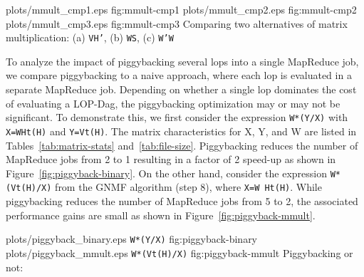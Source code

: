 

\some
{plots/mmult_cmp1.eps}
{fig:mmult-cmp1}
{plots/mmult_cmp2.eps}
{fig:mmult-cmp2}
{plots/mmult_cmp3.eps}
{fig:mmult-cmp3}
{Comparing two alternatives of matrix multiplication: (a) \texttt{V\mmult H'}, (b) \texttt{W\mmult S}, (c) \texttt{W'\mmult W}}


 To analyze the impact of piggybacking several lops into a single
MapReduce job, we compare piggybacking to a naive approach, where each lop is evaluated in a
separate MapReduce job. Depending on whether a single lop dominates the cost of evaluating a LOP-Dag,
the piggybacking optimization may or may not be significant. To demonstrate this, we first consider the expression
\texttt{W*(Y/X)} with \texttt{X=W\mmult H\mmult t(H)} and \texttt{Y=V\mmult t(H)}. The matrix
characteristics for X, Y, and W are listed in Tables~\ref{tab:matrix-stats}
and~\ref{tab:file-size}. Piggybacking reduces the number of MapReduce jobs from 2 to 1 resulting in
a factor of 2 speed-up as shown in Figure~\ref{fig:piggyback-binary}. On the other hand, consider
the expression \texttt{W*(V\mmult t(H)/X)} from the GNMF algorithm (step 8), where \texttt{X=W\mmult
  H\mmult t(H)}. While piggybacking reduces the number of MapReduce jobs from 5 to 2, the associated
performance gains are small as shown in Figure~\ref{fig:piggyback-mmult}.


\twosubfigures
{plots/piggyback_binary.eps}
{\texttt{W*(Y/X)}}
{fig:piggyback-binary}
{plots/piggyback_mmult.eps}
{\texttt{W*(V\mmult t(H)/X)}}
{fig:piggyback-mmult}
{Piggybacking or not:}

